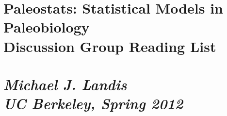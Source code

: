
\section*{Paleostats: Statistical Models in Paleobiology\\Discussion Group Reading List}
\section*{{\it Michael J. Landis}\\{\it UC Berkeley, Spring 2012}}
\nocite{*}



